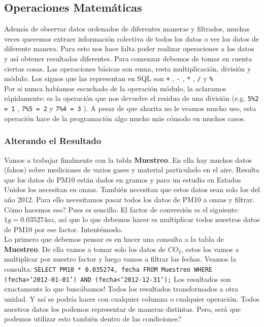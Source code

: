 \documentclass[10pt,letterpaper]{article}
\newcommand{\inlinecode}[1]{
\colorbox{light-gray}{\texttt{#1}}
}
\begin{document}
\subsection{Operaciones Matem\'aticas}
Adem\'as de observar datos ordenados de diferentes maneras y filtrados, muchas veces queremos extraer informaci\'on colectiva de todos los datos o ver los datos de diferente manera. Para esto nos hace falta poder realizar operaciones a los datos y as\'i obtener resultados diferentes. Para comenzar debemos de tomar en cuenta ciertas cosas. Las operaciones b\'asicas son suma, resta multiplicaci\'on, divisi\'on y m\'odulo. Los signos que las representan en SQL son \inlinecode{+}, \inlinecode{-}, \inlinecode{*}, \inlinecode{/} y \inlinecode{\%}\\

Por si nunca hab\'iamos escuchado de la operaci\'on m\'odulo, la aclaramos r\'apidamente: es la operaci\'on que nos devuelve el residuo de una divisi\'on (e.g. \inlinecode{5\%2 = 1}, \inlinecode{7\%5 = 2} y \inlinecode{7\%4 = 3}). A pesar de que ahorita no le veamos mucho uso, esta operaci\'on hace de la programaci\'on algo mucho m\'as c\'omodo en muchos casos.

\subsubsection{Alterando el Resultado}
Vamos a trabajar finalmente con la tabla \textbf{Muestreo}. En ella hay muchos datos (falsos) sobre mediciones de varios gases y material particulado en el aire. Resulta que los datos de PM10 est\'an dados en gramos y para un estudio en Estados Unidos los necesitan en onzas. Tambi\'en necesitan que estos datos sean solo los del a\~no 2012. Para ello necesitamos pasar todos los datos de PM10 a onzas y filtrar. C\'omo hacemos eso? Pues es sencillo. El factor de conversi\'on es el siguiente: $1g = 0.035274 oz$, as\'i que lo que debemos hacer es multiplicar todos nuestros datos de PM10 por ese factor. Intent\'emoslo.\\

Lo primero que debemos pensar es en hacer una consulta a la tabla de \textbf{Muestreo}. De ella vamos a tomar solo los datos de $CO_2$, estos los vamos a multiplicar por nuestro factor y luego vamos a filtrar las fechas. Veamos la consulta: \inlinecode{SELECT PM10 * 0.035274, fecha FROM Muestreo WHERE (fecha>'2012-01-01') AND (fecha<'2012-12-31');} Los resultados son exactamente lo que busc\'abamos! Todos los resultados transformados a otra unidad. Y as\'i se podr\'ia hacer con cualquier columna o cualquier operaci\'on. Todos nuestros datos los podemos representar de maneras distintas. Pero, ser\'a que podemos utilizar esto tambi\'en dentro de las condiciones?\\
\end{document}
